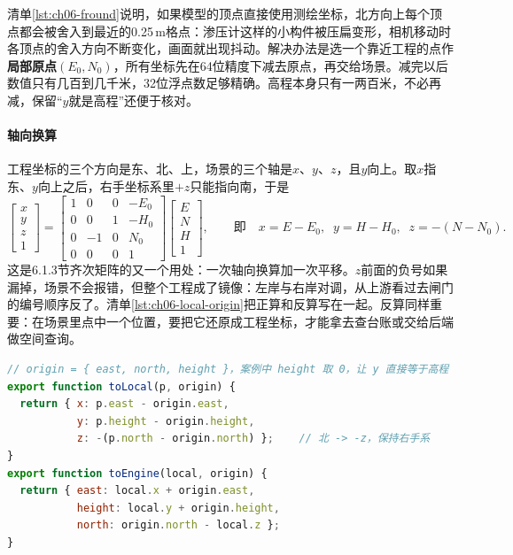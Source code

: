 清单\ref{lst:ch06-fround}说明，如果模型的顶点直接使用测绘坐标，北方向上每个顶点都会被舍入到最近的0.25\,m格点：渗压计这样的小构件被压扁变形，相机移动时各顶点的舍入方向不断变化，画面就出现抖动。解决办法是选一个靠近工程的点作\textbf{局部原点}$(E_0,N_0)$，所有坐标先在64位精度下减去原点，再交给场景。减完以后数值只有几百到几千米，32位浮点数足够精确。高程本身只有一两百米，不必再减，保留“$y$就是高程”还便于核对。

\paragraph{轴向换算}工程坐标的三个方向是东、北、上，场景的三个轴是$x$、$y$、$z$，且$y$向上。取$x$指东、$y$向上之后，右手坐标系里$+z$只能指向南，于是
\[
\begin{bmatrix}x\\y\\z\\1\end{bmatrix}
=\begin{bmatrix}1&0&0&-E_0\\0&0&1&-H_0\\0&-1&0&N_0\\0&0&0&1\end{bmatrix}
\begin{bmatrix}E\\N\\H\\1\end{bmatrix},
\qquad\text{即}\quad
x=E-E_0,\;\; y=H-H_0,\;\; z=-(N-N_0).
\]
这是6.1.3节齐次矩阵的又一个用处：一次轴向换算加一次平移。$z$前面的负号如果漏掉，场景不会报错，但整个工程成了镜像：左岸与右岸对调，从上游看过去闸门的编号顺序反了。清单\ref{lst:ch06-local-origin}把正算和反算写在一起。反算同样重要：在场景里点中一个位置，要把它还原成工程坐标，才能拿去查台账或交给后端做空间查询。

\begin{lstlisting}[label={lst:ch06-local-origin},language=JavaScript,caption={local-origin.js：工程坐标与场景局部坐标互转}]
// origin = { east, north, height }，案例中 height 取 0，让 y 直接等于高程
export function toLocal(p, origin) {
  return { x: p.east - origin.east,
           y: p.height - origin.height,
           z: -(p.north - origin.north) };    // 北 -> -z，保持右手系
}
export function toEngine(local, origin) {
  return { east: local.x + origin.east,
           height: local.y + origin.height,
           north: origin.north - local.z };
}
\end{lstlisting}


